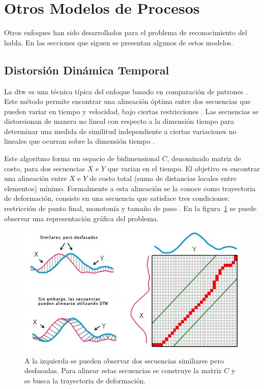 \section{Otros Modelos de Procesos}
\label{sec:otrosModelos}

Otros enfoques han sido desarrollados para el problema de reconocimiento del habla. En las secciones que siguen
se presentan algunos de estos modelos.

\subsection{Distorsi\'on Din\'amica Temporal}
\label{sec:dtw}

La \gls{dtw} es una t\'ecnica t\'ipica del enfoque basado en comparaci\'on de patrones \cite{GaikwadAReview2010}. 
Este m\'etodo permite encontrar una alineaci\'on \'optima 
entre dos secuencias que pueden variar en tiempo y velocidad, bajo ciertas restricciones \cite{MullerInformation2007}.
Las secuencias se distorsionan de manera no lineal con respecto a la dimensi\'on tiempo para determinar una medida
de similitud independiente a ciertas variaciones no lineales que ocurran sobre la dimensi\'on tiempo \cite{AnusuyaSpeech2009}.

Este algoritmo forma un espacio de bidimensional $C$, denominado matriz de costo, para dos secuencias $X$ e $Y$ que varian en 
el tiempo. El objetivo es encontrar
una alineaci\'on entre $X$ e $Y$ de costo total (suma de distancias locales entre elementos) m\'inimo. 
Formalmente a esta alineaci\'on se la conoce como trayectoria de
deformaci\'on, consiste en una secuencia que satisface tres condiciones: restricci\'on de punto final, 
monoton\'ia y tama\~no de paso \cite{MullerInformation2007}. En la figura~\ref{figure:dtw} se puede observar
una representaci\'on gr\'afica del problema.

\begin{figure}[H]
\centering
\includegraphics[width=0.9\linewidth]{./graphics/dtw.png}
\caption{A la izquierda se pueden observar dos secuencias similiares pero desfasadas. Para alinear estas secuencias
se construye la matriz $C$ y se busca la trayectoria de deformaci\'on.}
\label{figure:dtw}
\end{figure}

